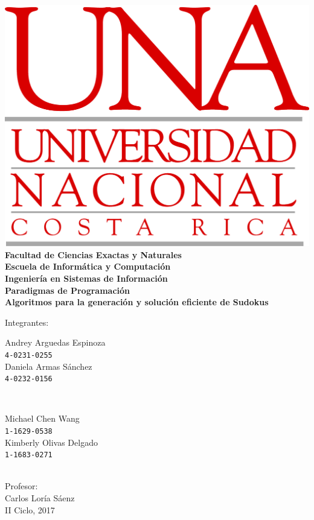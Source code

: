\documentclass[conference]{IEEEtran}
\begin{document}
\begin{titlepage}

\centering
\includegraphics[scale=0.6]{una.png}\\[10mm]

\textbf{
    {\Large Facultad de Ciencias Exactas y Naturales\\[3mm]
    Escuela de Informática y Computación\\[3mm]
    Ingeniería en Sistemas de Información\\[3mm]
    Paradigmas de Programación}\\[15mm]
    {\LARGE Algoritmos para la generación y solución eficiente de Sudokus}\\[15mm]
}

\large{Integrantes:}\\[3mm]

\begin{minipage}{0.4\textwidth}
\begin{flushleft} \large
\centering
    Andrey Arguedas Espinoza\\
    \texttt{4-0231-0255}\\
    Daniela Armas Sánchez\\
    \texttt{4-0232-0156}\\
\end{flushleft}
\end{minipage}
~
\begin{minipage}{0.4\textwidth}
\begin{flushleft} \large
\centering
    Michael Chen Wang\\
    \texttt{1-1629-0538}\\
    Kimberly Olivas Delgado\\
    \texttt{1-1683-0271}\\
\end{flushleft}
\end{minipage}\\[15mm]

\large{Profesor: \\[3mm] Carlos Loría Sáenz}\\[15mm]

\large {II Ciclo, 2017}

\end{titlepage}
\end{document}
